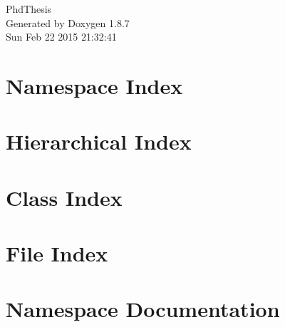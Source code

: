 \documentclass[twoside]{book}
\newcommand{\+}{\discretionary{\mbox{\scriptsize$\hookleftarrow$}}{}{}}
\newcommand{\clearemptydoublepage}{%
  \newpage{\pagestyle{empty}\cleardoublepage}%
}
\begin{document}
\hypersetup{pageanchor=false,
             bookmarks=true,
             bookmarksnumbered=true,
             pdfencoding=unicode
            }
\begin{titlepage}
\vspace*{7cm}
\begin{center}%
{\Large Phd\+Thesis }\\
\vspace*{1cm}
{\large Generated by Doxygen 1.8.7}\\
\vspace*{0.5cm}
{\small Sun Feb 22 2015 21:32:41}\\
\end{center}
\end{titlepage}
\clearemptydoublepage
\tableofcontents
\clearemptydoublepage
{}
\hypersetup{pageanchor=true}

\chapter{Namespace Index}

\chapter{Hierarchical Index}

\chapter{Class Index}

\chapter{File Index}

\chapter{Namespace Documentation}

\end{document}
